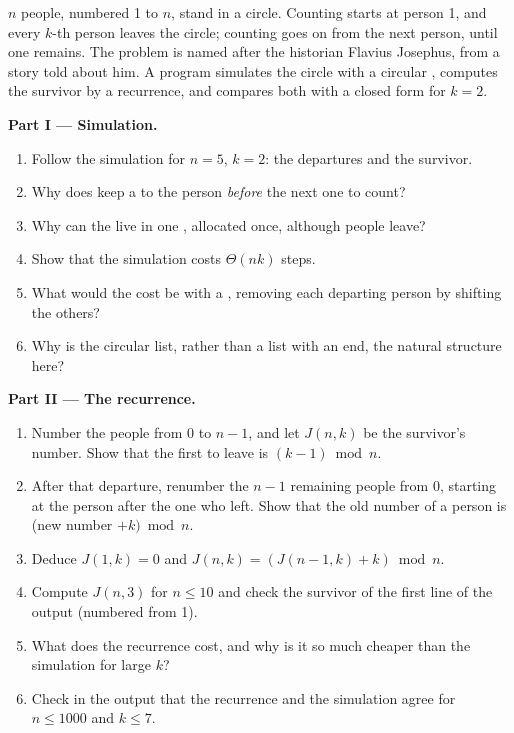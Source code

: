 \begin{problem}\label{pb:b1:linked-structures:1}
$n$ people, numbered 1 to $n$, stand in a circle. Counting starts at person 1, and every $k$-th person leaves the circle;
counting goes on from the next person, until one remains. The problem is named after the historian Flavius Josephus,
from a story told about him. A program simulates the circle with a circular , computes the survivor by a
recurrence, and compares both with a closed form for $k = 2$.
\label{lst:b1:linked-structures:josephus}
\label{out:b1:linked-structures:josephus}

\medskip\noindent\textbf{Part I --- Simulation.}
\begin{enumerate}
\item Follow the simulation for $n = 5$, $k = 2$: the departures and the survivor.
\item Why does  keep a  to the person \emph{before} the next one to count?
\item Why can the  live in one , allocated once, although people leave?
\item Show that the simulation costs $\Theta(nk)$ steps.
\item What would the cost be with a , removing each departing person by shifting the others?
\item Why is the circular list, rather than a list with an end, the natural structure here?
\end{enumerate}

\medskip\noindent\textbf{Part II --- The recurrence.}
\begin{enumerate}[resume]
\item Number the people from 0 to $n - 1$, and let $J(n, k)$ be the survivor's number. Show that the first to leave is
$(k - 1) \bmod n$.
\item After that departure, renumber the $n - 1$ remaining people from 0, starting at the person after the one who
left. Show that the old number of a person is (new number $+ k) \bmod n$.
\item Deduce $J(1, k) = 0$ and $J(n, k) = (J(n - 1, k) + k) \bmod n$.
\item Compute $J(n, 3)$ for $n \leq 10$ and check the survivor of the first line of the output (numbered from 1).
\item What does the recurrence cost, and why is it so much cheaper than the simulation for large $k$?
\item Check in the output that the recurrence and the simulation agree for $n \leq 1000$ and $k \leq 7$.
\end{enumerate}


\end{problem}
